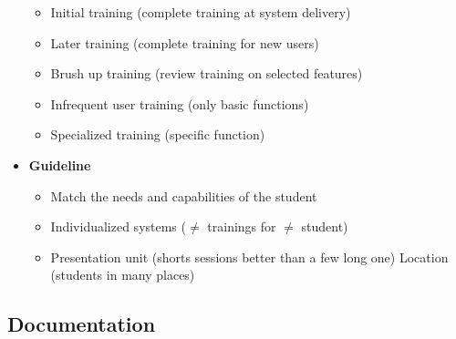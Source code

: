 \begin{itemize}
\begin{itemize}
    \item Initial training (complete training at system delivery)
    \item Later training (complete training for new users)
    \item Brush up training (review training on selected features)
    \item Infrequent user training (only basic functions)
    \item Specialized training (specific function)
\end{itemize}

\item \textbf{Guideline}
    \begin{itemize}
        \item Match the needs and capabilities of the student
        \item Individualized systems ($\neq$ trainings for
            $\neq$ student)
        \item Presentation unit (shorts sessions better than a
            few long one)
            \itme Location (students in many places)
    \end{itemize}
\end{itemize}

\subsection{Documentation}

